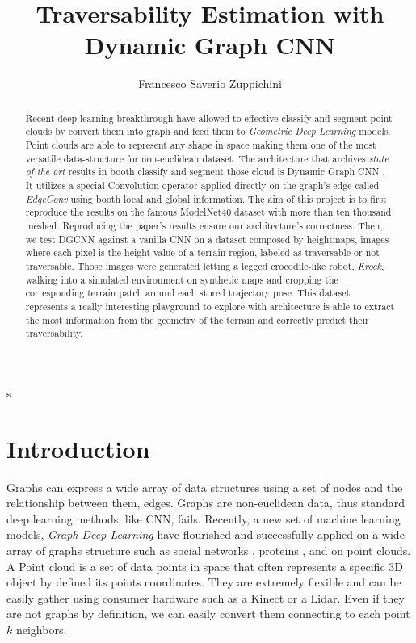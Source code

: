 \documentclass[twocolumn,showpacs,
  nofootinbib,aps,superscriptaddress,
  eqsecnum,prd,notitlepage,showkeys,10pt]{article}
\begin{document}
\title{Traversability Estimation with Dynamic Graph CNN}
\author{Francesco Saverio Zuppichini}
\begin{abstract}
  Recent deep learning breakthrough have allowed to effective classify and segment point clouds by convert them into graph and feed them to \emph{Geometric Deep Learning} models. Point clouds are able to represent any shape in space making them one of the most versatile data-structure for non-euclidean dataset. The architecture that archives \emph{state of the art} results in booth classify and segment those cloud is Dynamic Graph CNN \cite{dgcnn}. It utilizes a special Convolution operator applied directly on the graph's edge called \emph{EdgeConv} using booth local and global information. The aim of this project is to first reproduce the results on the famous ModelNet40 \cite{shapenet} dataset with more than ten thousand meshed. Reproducing the paper's results ensure our architecture's correctness.
  Then, we test DGCNN against a vanilla CNN on a dataset composed by heightmaps, images where each pixel is the height value of a terrain region, labeled as traversable or not traversable. Those images were generated letting a legged crocodile-like robot, \emph{Krock}, walking into a simulated environment on synthetic maps and cropping the corresponding terrain patch around each stored trajectory pose. This dataset represents
   a really interesting playground to explore with architecture is able to extract the most information from the geometry of the terrain and correctly predict their traversability. 
\end{abstract}s
\maketitle
\section{Introduction}

Graphs can express a wide array of data structures using a set of nodes and the relationship between them, edges. Graphs are non-euclidean data, thus standard deep learning methods, like CNN, fails. Recently, a new set of machine learning models, \emph{Graph Deep Learning} have flourished and successfully applied on a wide array of graphs structure such as social networks , proteins , and on point clouds. A Point cloud is a set of data points in space that often represents a specific 3D object by defined its points coordinates. They are extremely flexible and can be easily gather using consumer hardware such as a Kinect or a Lidar. Even if they are not graphs by definition, we can easily convert them connecting to each point $k$ neighbors.
\end{document}
